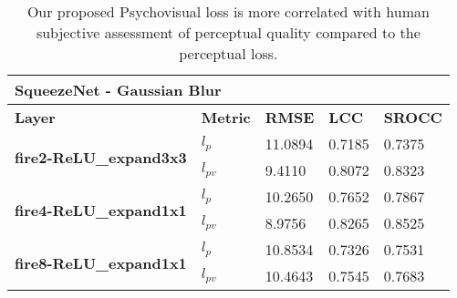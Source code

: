 \documentclass[10pt,twocolumn,letterpaper]{article}
\begin{document}
\begin{table*}[]
\centering
\caption{Our proposed Psychovisual loss is more correlated with human subjective assessment of perceptual quality compared to the perceptual loss.}
\begin{tabular}{|l|l|l|l|l|}
\hline
\multicolumn{5}{|l|}{\textbf{SqueezeNet - Gaussian Blur}}                                                         \\ \hline
\textbf{Layer}                                  & \textbf{Metric} & \textbf{RMSE} & \textbf{LCC} & \textbf{SROCC} \\ \hline
\multirow{2}{*}{\textbf{fire2-ReLU\_expand3x3}} & \textbf{$l_{p}$}              & 11.0894       & 0.7185       & 0.7375         \\ \cline{2-5} 
                                                & \textbf{$l_{pv}$}             & 9.4110        & 0.8072       & 0.8323         \\ \hline
\multirow{2}{*}{\textbf{fire4-ReLU\_expand1x1}} & \textbf{$l_{p}$}              & 10.2650       & 0.7652       & 0.7867         \\ \cline{2-5} 
                                                & \textbf{$l_{pv}$}             & 8.9756        & 0.8265       & 0.8525         \\ \hline
\multirow{2}{*}{\textbf{fire8-ReLU\_expand1x1}} & \textbf{$l_{p}$}              & 10.8534       & 0.7326       & 0.7531         \\ \cline{2-5} 
                                                & \textbf{$l_{pv}$}             & 10.4643       & 0.7545       & 0.7683         \\ \hline
\end{tabular}
\end{table*}
 
\end{document}
